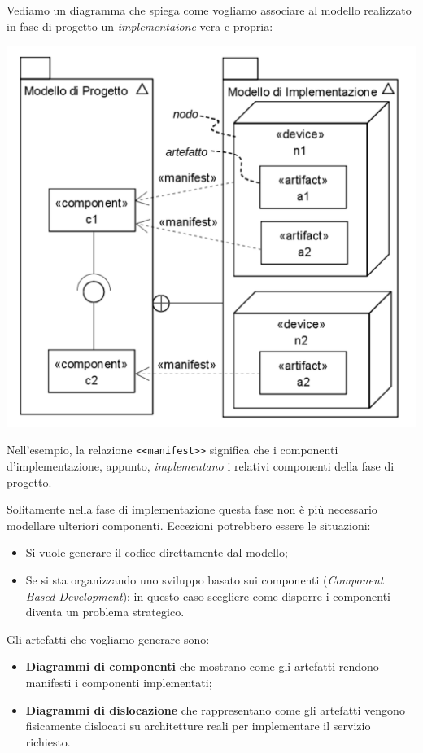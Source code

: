\documentclass[a4paper,11pt]{article}
\begin{document}
Vediamo un diagramma che spiega come vogliamo associare al modello realizzato in fase di progetto un \textit{implementaione} vera e propria:
\begin{center}
	\includegraphics[scale=0.4]{../figures/implementazione.png}
\end{center}
Nell'esempio, la relazione \lstinline|<<manifest>>| significa che i componenti d'implementazione, appunto, \textit{implementano} i relativi componenti della fase di progetto.

Solitamente nella fase di implementazione questa fase non è più necessario modellare ulteriori componenti.
Eccezioni potrebbero essere le situazioni:
\begin{itemize}
	\item Si vuole generare il codice direttamente dal modello;
	\item Se si sta organizzando uno sviluppo basato sui componenti (\textit{Component Based Development}): in questo caso scegliere come disporre i componenti diventa un problema strategico.
\end{itemize}

Gli artefatti che vogliamo generare sono:
\begin{itemize}
	\item \textbf{Diagrammi di componenti} che mostrano come gli artefatti rendono manifesti i componenti implementati;
	\item \textbf{Diagrammi di dislocazione} che rappresentano come gli artefatti vengono fisicamente dislocati su architetture reali per implementare il servizio richiesto. 
\end{itemize}
\end{document}
